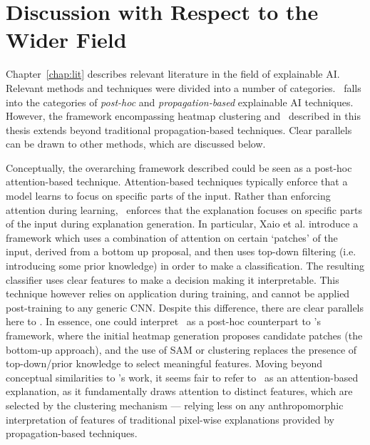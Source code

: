 \section{Discussion with Respect to the Wider Field}
Chapter~\ref{chap:lit} describes relevant literature in the field of explainable AI. Relevant methods and techniques were divided into a number of categories. \CTC\ falls into the categories of \textit{post-hoc} and \textit{propagation-based} explainable AI techniques.  However, the framework encompassing heatmap clustering and \CTC\ described in this thesis extends beyond traditional propagation-based techniques. Clear parallels can be drawn to other methods, which are discussed below.

Conceptually, the overarching framework described could be seen as a post-hoc attention-based technique. Attention-based techniques typically enforce that a model learns to focus on specific parts of the input. Rather than enforcing attention during learning, \CTC\ enforces that the explanation focuses on specific parts of the input during explanation generation. In particular, Xaio et al. \cite{XiaoXYZPZ15} introduce a framework which uses a combination of attention on certain `patches' of the input, derived from a bottom up proposal, and then uses top-down filtering (i.e. introducing some prior knowledge) in order to make a classification. The resulting classifier uses clear features to make a decision making it interpretable. This technique however relies on application during training, and cannot be applied post-training to any generic CNN. Despite this difference, there are clear parallels here to \CTC. In essence, one could interpret \CTC\ as a post-hoc counterpart to \cite{XiaoXYZPZ15}'s framework, where the initial heatmap generation proposes candidate patches (the bottom-up approach), and the use of SAM or clustering replaces the presence of top-down/prior knowledge to select meaningful features. Moving beyond conceptual similarities to \cite{XiaoXYZPZ15}'s work, it seems fair to refer to \CTC\ as an attention-based explanation, as it fundamentally draws attention to distinct features, which are selected by the clustering mechanism --- relying less on any anthropomorphic interpretation of features of traditional pixel-wise explanations provided by propagation-based techniques.


